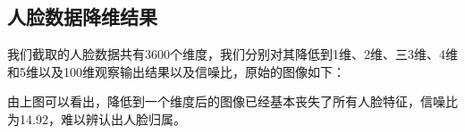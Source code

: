 \documentclass[12pt]{article}
\begin{document}
\subsection{人脸数据降维结果}
我们截取的人脸数据共有3600个维度，我们分别对其降低到1维、2维、三3维、4维和5维以及100维观察输出结果以及信噪比，原始的图像如下：
\begin{figure}[H]
    \centering
\end{figure}
\begin{figure}[H]
    \centering
\end{figure}
由上图可以看出，降低到一个维度后的图像已经基本丧失了所有人脸特征，信噪比为14.92，难以辨认出人脸归属。
\begin{figure}[H]
    \centering
\end{figure}
\end{document}
